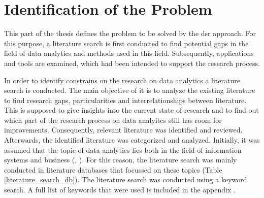 \newpage\section{Identification of the Problem}\label{sec:identification_of_the_problem}


This part of the thesis defines the problem to be solved by the \ac{dsr} approach. For this purpose, a literature search is first conducted to find potential gaps in the field of data analytics and methods used in this field. Subsequently, applications and tools are examined, which had been intended to support the research process.

In order to identify constrains on the research on data analytics a literature search is conducted. The main objective of it is to analyze the existing literature to find research gaps, particularities and interrelationships between literature. This is supposed to give insights into the current state of research and to find out which part of the research process on data analyitcs still has room for improvements. %
Consequently, relevant literature was identified and reviewed. Afterwards, the identified literature was categorized and analyzed. Initially, it was assumed that the topic of data analytics lies both in the field of information systems and business (\cite{Abbasi.2016}, \cite{Levina.2005}). For this reason, the literature search was mainly conducted in literature databases that focussed on these topics (Table \ref{literature_search_db}).%
The literature search was conducted using a keyword search. %
A full list of keywords that were used is included in the appendix . %

